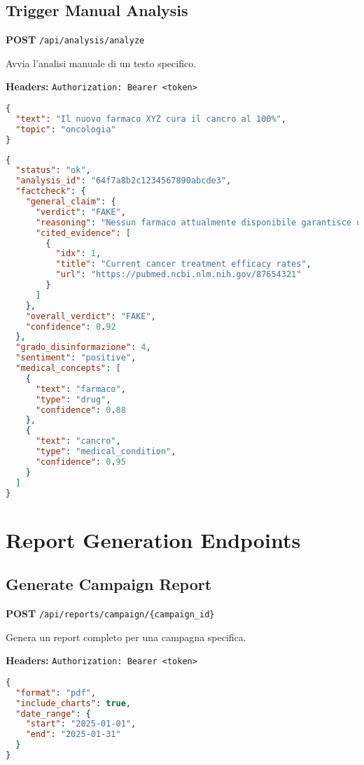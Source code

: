 \documentclass[12pt,a4paper]{report}
\begin{document}
\subsection{Trigger Manual Analysis}

\textbf{POST} \texttt{/api/analysis/analyze}

Avvia l'analisi manuale di un testo specifico.

\textbf{Headers:} \texttt{Authorization: Bearer <token>}

\begin{lstlisting}[language=json, caption=Request Body]
{
  "text": "Il nuovo farmaco XYZ cura il cancro al 100%",
  "topic": "oncologia"
}
\end{lstlisting}

\begin{lstlisting}[language=json, caption=Response (200 OK)]
{
  "status": "ok",
  "analysis_id": "64f7a8b2c1234567890abcde3",
  "factcheck": {
    "general_claim": {
      "verdict": "FAKE",
      "reasoning": "Nessun farmaco attualmente disponibile garantisce una cura al 100% per il cancro",
      "cited_evidence": [
        {
          "idx": 1,
          "title": "Current cancer treatment efficacy rates",
          "url": "https://pubmed.ncbi.nlm.nih.gov/87654321"
        }
      ]
    },
    "overall_verdict": "FAKE",
    "confidence": 0.92
  },
  "grado_disinformazione": 4,
  "sentiment": "positive",
  "medical_concepts": [
    {
      "text": "farmaco",
      "type": "drug",
      "confidence": 0.88
    },
    {
      "text": "cancro",
      "type": "medical_condition",
      "confidence": 0.95
    }
  ]
}
\end{lstlisting}

\section{Report Generation Endpoints}

\subsection{Generate Campaign Report}

\textbf{POST} \texttt{/api/reports/campaign/\{campaign\_id\}}

Genera un report completo per una campagna specifica.

\textbf{Headers:} \texttt{Authorization: Bearer <token>}

\begin{lstlisting}[language=json, caption=Request Body]
{
  "format": "pdf",
  "include_charts": true,
  "date_range": {
    "start": "2025-01-01",
    "end": "2025-01-31"
  }
}
\end{lstlisting}
\end{document}
